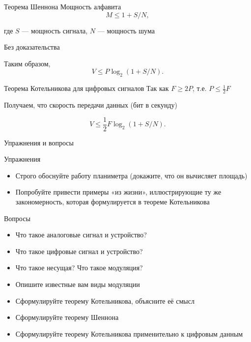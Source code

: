 \documentclass[xetex,aspectratio=43]{beamer}
\begin{document}
\begin{frame}{Теорема Шеннона}
	Мощность алфавита \[M \le 1+S/N,\]
	
	где \(S\) --- мощность сигнала, \(N\) --- мощность шума
	
	Без доказательства
	
	\pause
	
	Таким образом, \[V \le P \log_2(1+S/N).\]
\end{frame}

\begin{frame}{Теорема Котельникова для цифровых сигналов}
	Так как \(F \ge 2P\), т.е. \(P \le \frac{1}{2} F\)
	
	Получаем, что скорость передачи данных (бит в секунду)
	
	\[V \le \frac{1}{2} F \log_2 (1+S/N).\]		
\end{frame}

\begin{frame}{Упражнения и вопросы}
	\begin{block}{Упражнения}
		\begin{itemize}
			
			\item
			Строго обоснуйте работу планиметра (докажите, что он вычисляет
			площадь)
			\item
			Попробуйте привести примеры «из жизни», иллюстрирующие ту же
			закономерность, которая формулируется в теореме Котельникова
		\end{itemize}
	\end{block}
	
	\begin{block}{Вопросы}
		\begin{itemize}
			
			\item
			Что такое аналоговые сигнал и устройство?
			\item
			Что такое цифровые сигнал и устройство?
			\item
			Что такое несущая? Что такое модуляция?
			\item
			Опишите известные вам виды модуляции
			\item
			Сформулируйте теорему Котельникова, объясните её смысл
			\item
			Сформулируйте теорему Шеннона
			\item
			Сформулируйте теорему Котельникова применительно к цифровым данным
		\end{itemize}
	\end{block}
\end{frame}

\postamble
\end{document}

